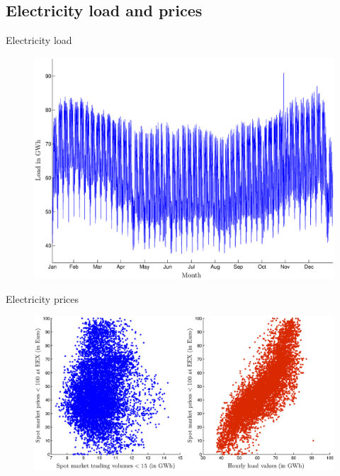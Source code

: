 \subsection{Electricity load and prices}

\begin{frame} {Electricity load}
					
\begin{figure}[h]
\centering
\includegraphics[width=1.0\textwidth, angle=0]{loadvalues}
    \label{fig:load}            
\end{figure}
\end{frame}

\begin{frame} {Electricity prices}				
\begin{figure}[h]
\centering
\includegraphics[width=1.0\textwidth, angle=0]{pricequant}
    \label{fig:load}            
\end{figure}
\end{frame}

